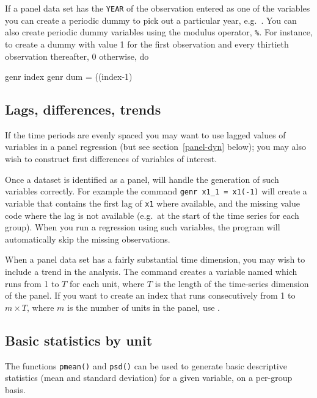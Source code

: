 If a panel data set has the \verb+YEAR+ of the observation entered as
one of the variables you can create a periodic dummy to pick out a
particular year, e.g.\ .  You can also
create periodic dummy variables using the modulus operator,
\verb+%+.  For instance, to create a dummy with
value 1 for the first observation and every thirtieth observation
thereafter, 0 otherwise, do
%
\begin{code}
genr index 
genr dum = ((index-1) %
\end{code}

\subsection{Lags, differences, trends}
\label{panel-lagged}

If the time periods are evenly spaced you may want to use lagged
values of variables in a panel regression (but see
section~\ref{panel-dyn} below); you may also wish to construct first
differences of variables of interest.

Once a dataset is identified as a panel,  will handle the
generation of such variables correctly.  For example the command
\verb+genr x1_1 = x1(-1)+ will create a variable that contains the
first lag of \verb+x1+ where available, and the missing value code
where the lag is not available (e.g.\ at the start of the time series
for each group).  When you run a regression using such variables, the
program will automatically skip the missing observations.

When a panel data set has a fairly substantial time dimension, you may
wish to include a trend in the analysis.  The command  
creates a variable named  which runs from 1 to $T$ for
each unit, where $T$ is the length of the time-series dimension of the
panel.  If you want to create an index that runs consecutively from 1
to $m\times T$, where $m$ is the number of units in the panel, use
.

\subsection{Basic statistics by unit}
\label{panel-stats}

The functions \texttt{pmean()} and \texttt{psd()} can be used to
generate basic descriptive statistics (mean and standard deviation)
for a given variable, on a per-group basis.  

